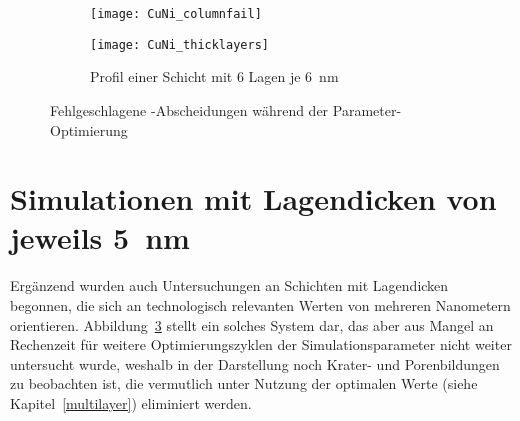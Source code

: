 \begin{figure}[!ht]
  \captionsetup[subfigure]{singlelinecheck=false}
  \def\subfigwidth{7cm}
  \begin{subfigure}[t]{\subfigwidth}
    \texttt{[image: CuNi\_columnfail]}
    \label{fig:multilayer_columnfail}
  \end{subfigure}
  \hfill
  \begin{subfigure}[t]{\subfigwidth}
    \texttt{[image: CuNi\_thicklayers]}
    \caption{Profil einer Schicht mit 6 Lagen je \SI{6}{\nano\meter}}
    \label{fig:multilayer_thickfail}
  \end{subfigure}
  \caption[: Bildung von Nanoporen und \SI{5}{\nano\meter} dicken Lagen]{Fehlgeschlagene -Abscheidungen während der Parameter-Optimierung}
\end{figure}

\section{Simulationen mit Lagendicken von jeweils \texorpdfstring{\SI{5}{\nano\meter}}{5 nm}}

Ergänzend wurden auch Untersuchungen an Schichten mit Lagendicken begonnen, die sich an technologisch relevanten Werten von mehreren Nanometern orientieren.
Abbildung~\ref{fig:multilayer_thickfail} stellt ein solches System dar, das aber aus Mangel an Rechenzeit für weitere Optimierungszyklen der Simulationsparameter nicht weiter untersucht wurde, weshalb in der Darstellung noch Krater- und Porenbildungen zu beobachten ist, die vermutlich unter Nutzung der optimalen Werte (siehe Kapitel~\ref{multilayer}) eliminiert werden.
